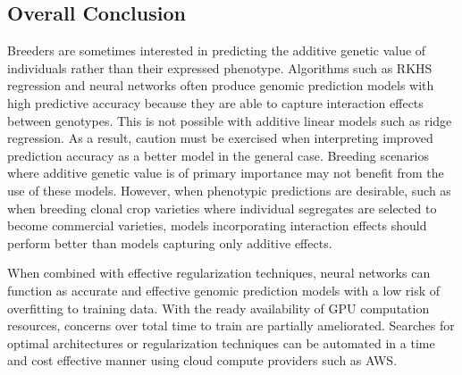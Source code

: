 \ifdefined\showtablesandfigures
\fi

\subsection*{Overall Conclusion}

Breeders are sometimes interested in predicting the additive genetic value of 
individuals rather than their expressed phenotype. Algorithms such as 
RKHS regression and neural networks often produce genomic prediction 
models with high predictive accuracy because they are able to capture 
interaction effects between genotypes. This is not possible with additive 
linear models such as ridge regression. As a result, caution must be exercised 
when interpreting improved prediction accuracy as a better model in the 
general case. Breeding scenarios where additive genetic value is of primary 
importance may not benefit from the use of these models. However, when phenotypic 
predictions are desirable, such as when breeding clonal crop varieties where 
individual segregates are selected to become commercial varieties, models 
incorporating interaction effects should perform better than models capturing 
only additive effects.

When combined with effective regularization techniques, neural networks can function
as accurate and effective genomic prediction models with a low risk of overfitting
to training data. With the ready availability of GPU computation resources, concerns
over total time to train are partially ameliorated. Searches for optimal architectures or 
regularization techniques can be automated in a time and cost effective 
manner using cloud compute providers such as AWS.

